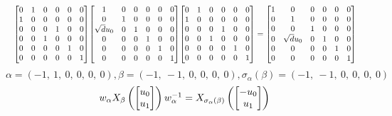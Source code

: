 \documentclass[11pt]{article}
\theoremstyle{definition}
\begin{document}
\[
\scaletoalign{\textwidth}{{\left[\begin{matrix}0 & 1 & 0 & 0 & 0 & 0\\1 & 0 & 0 & 0 & 0 & 0\\0 & 0 & 0 & 1 & 0 & 0\\0 & 0 & 1 & 0 & 0 & 0\\0 & 0 & 0 & 0 & 1 & 0\\0 & 0 & 0 & 0 & 0 & 1\end{matrix}\right]} {\left[\begin{matrix}1 & 0 & 0 & 0 & 0 & 0\\0 & 1 & 0 & 0 & 0 & 0\\\sqrt{d} u_{0} & 0 & 1 & 0 & 0 & 0\\0 & 0 & 0 & 1 & 0 & 0\\0 & 0 & 0 & 0 & 1 & 0\\0 & 0 & 0 & 0 & 0 & 1\end{matrix}\right]} {\left[\begin{matrix}0 & 1 & 0 & 0 & 0 & 0\\1 & 0 & 0 & 0 & 0 & 0\\0 & 0 & 0 & 1 & 0 & 0\\0 & 0 & 1 & 0 & 0 & 0\\0 & 0 & 0 & 0 & 1 & 0\\0 & 0 & 0 & 0 & 0 & 1\end{matrix}\right]} = {\left[\begin{matrix}1 & 0 & 0 & 0 & 0 & 0\\0 & 1 & 0 & 0 & 0 & 0\\0 & 0 & 1 & 0 & 0 & 0\\0 & \sqrt{d} u_{0} & 0 & 1 & 0 & 0\\0 & 0 & 0 & 0 & 1 & 0\\0 & 0 & 0 & 0 & 0 & 1\end{matrix}\right]}}
\]
\[
\alpha = \left( -1, \  1, \  0, \  0, \  0, \  0\right), \beta = \left( -1, \  -1, \  0, \  0, \  0, \  0\right), \sigma_{\alpha}(\beta) = \left( -1, \  -1, \  0, \  0, \  0, \  0\right)
\]
\[
\scaletoalign{\textwidth}{w_{\alpha} X_{\beta}\left(\left[\begin{matrix}u_{0}\\u_{1}\end{matrix}\right]\right) w_{\alpha}^{-1} = X_{\sigma_{\alpha}\left(\beta\right)}\left(\left[\begin{matrix}- u_{0}\\u_{1}\end{matrix}\right]\right)}
\]
\end{document}
